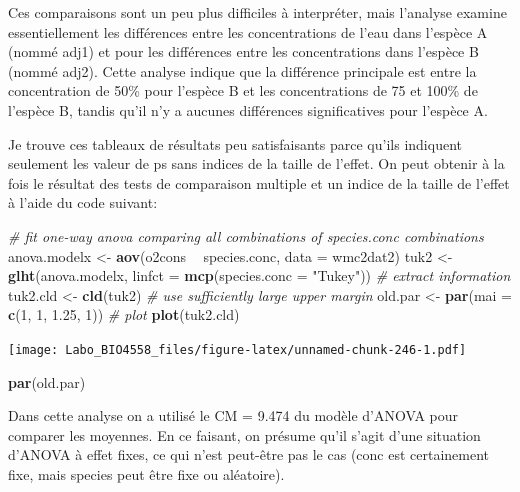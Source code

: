 \documentclass[12pt,]{book}
\newenvironment{Shaded}{\begin{snugshade}}{\end{snugshade}}
\newcommand{\CommentTok}[1]{\textcolor[rgb]{0.37,0.37,0.37}{\textit{#1}}}
\newcommand{\DataTypeTok}[1]{\textcolor[rgb]{0.27,0.27,0.27}{#1}}
\newcommand{\DecValTok}[1]{\textcolor[rgb]{0.06,0.06,0.06}{#1}}
\newcommand{\FloatTok}[1]{\textcolor[rgb]{0.06,0.06,0.06}{#1}}
\newcommand{\KeywordTok}[1]{\textcolor[rgb]{0.27,0.27,0.27}{\textbf{#1}}}
\newcommand{\NormalTok}[1]{#1}
\newcommand{\OperatorTok}[1]{\textcolor[rgb]{0.43,0.43,0.43}{\textbf{#1}}}
\newcommand{\StringTok}[1]{\textcolor[rgb]{0.5,0.5,0.5}{#1}}
\begin{document}
Ces comparaisons sont un peu plus difficiles à interpréter, mais l'analyse examine essentiellement les différences entre les concentrations de l'eau dans l'espèce A (nommé adj1) et pour les différences entre les concentrations dans l'espèce B (nommé adj2). Cette analyse indique que la différence principale est entre la concentration de 50\% pour l'espèce B et les concentrations de 75 et 100\% de l'espèce B, tandis qu'il n'y a aucunes différences significatives pour l'espèce A.

Je trouve ces tableaux de résultats peu satisfaisants parce qu'ils indiquent seulement les valeur de ps sans indices de la taille de l'effet. On peut obtenir à la fois le résultat des tests de comparaison multiple et un indice de la taille de l'effet à l'aide du code suivant:

\begin{Shaded}
\begin{Highlighting}[]
\CommentTok{# fit one-way anova comparing all combinations of species.conc combinations}
\NormalTok{anova.modelx <-}\StringTok{ }\KeywordTok{aov}\NormalTok{(o2cons }\OperatorTok{~}\StringTok{ }\NormalTok{species.conc, }\DataTypeTok{data =}\NormalTok{ wmc2dat2)}
\NormalTok{tuk2 <-}\StringTok{ }\KeywordTok{glht}\NormalTok{(anova.modelx, }\DataTypeTok{linfct =} \KeywordTok{mcp}\NormalTok{(}\DataTypeTok{species.conc =} \StringTok{"Tukey"}\NormalTok{))}
\CommentTok{# extract information}
\NormalTok{tuk2.cld <-}\StringTok{ }\KeywordTok{cld}\NormalTok{(tuk2)}
\CommentTok{# use sufficiently large upper margin}
\NormalTok{old.par <-}\StringTok{ }\KeywordTok{par}\NormalTok{(}\DataTypeTok{mai =} \KeywordTok{c}\NormalTok{(}\DecValTok{1}\NormalTok{, }\DecValTok{1}\NormalTok{, }\FloatTok{1.25}\NormalTok{, }\DecValTok{1}\NormalTok{))}
\CommentTok{# plot}
\KeywordTok{plot}\NormalTok{(tuk2.cld)}
\end{Highlighting}
\end{Shaded}

\texttt{[image: Labo\_BIO4558\_files/figure-latex/unnamed-chunk-246-1.pdf]}

\begin{Shaded}
\begin{Highlighting}[]
\KeywordTok{par}\NormalTok{(old.par)}
\end{Highlighting}
\end{Shaded}

Dans cette analyse on a utilisé le CM = 9.474 du modèle d'ANOVA pour comparer les moyennes. En ce faisant, on présume qu'il s'agit d'une situation d'ANOVA à effet fixes, ce qui n'est peut-être pas le cas (conc est certainement fixe, mais species peut être fixe ou aléatoire).
\end{document}
